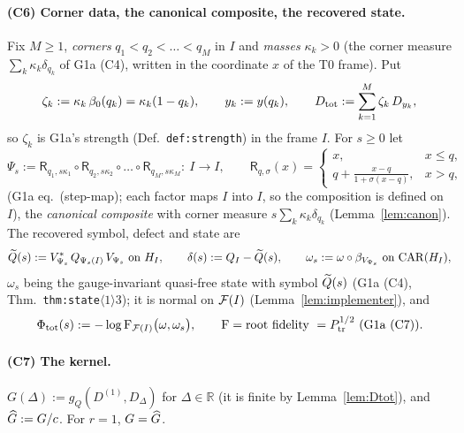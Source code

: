 \documentclass[11pt]{article}
\newcommand{\Dtot}{D_{\rm tot}}\newcommand{\Rp}{\mathsf R}\newcommand{\Lp}{\mathsf L}\newcommand{\Sch}{\mathcal S}
\theoremstyle{definition}\newtheorem{hypothesis}[theorem]{Hypothesis}
\begin{document}
\paragraph{(C6) Corner data, the canonical composite, the recovered state.}
Fix $M\ge1$, \emph{corners} $q_1<q_2<\dots<q_M$ in $I$ and \emph{masses} $\kappa_k>0$ (the corner measure
$\sum_k\kappa_k\delta_{q_k}$ of G1a (C4), written in the coordinate $x$ of the T0 frame).  Put
\begin{equation}\label{eq:zeta}
 \zeta_k:=\kappa_k\,\beta_0(q_k)=\kappa_k(1-q_k),\qquad y_k:=y(q_k),\qquad
 \Dtot:=\sum_{k=1}^M\zeta_k\,D_{y_k},
\end{equation}
so $\zeta_k$ is G1a's strength (Def.~\texttt{def:strength}) in the frame $I$.  For $s\ge0$ let
\begin{equation}\label{eq:Psi}
 \Psi_s:=\Rp_{q_1,s\kappa_1}\circ\Rp_{q_2,s\kappa_2}\circ\dots\circ\Rp_{q_M,s\kappa_M}:\ I\to I,
 \qquad \Rp_{q,\sigma}(x)=\begin{cases}x,&x\le q,\\ q+\frac{x-q}{1+\sigma(x-q)},&x>q,\end{cases}
\end{equation}
(G1a eq.~(step-map); each factor maps $I$ into $I$, so the composition is defined on $I$), the
\emph{canonical composite} with corner measure $s\sum_k\kappa_k\delta_{q_k}$
(Lemma~\ref{lem:canon}).  The recovered symbol, defect and state are
\begin{equation}\label{eq:Qts}
 \widetilde Q(s):=V_{\Psi_s}^*\,Q_{\Psi_s(I)}\,V_{\Psi_s}\ \text{on }H_I,\qquad \delta(s):=Q_I-\widetilde Q(s),\qquad
 \omega_s:=\omega\circ\beta_{V_{\Psi_s}}\ \text{on }\mathrm{CAR}(H_I),
\end{equation}
$\omega_s$ being the gauge-invariant quasi-free state with symbol $\widetilde Q(s)$ (G1a (C4),
Thm.~\texttt{thm:state}$\langle1\rangle3$); it is normal on $\mathcal F(I)$ (Lemma~\ref{lem:implementer}), and
\begin{equation}\label{eq:Phitot}
 \Phi_{\rm tot}(s):=-\log\operatorname{F}_{\mathcal F(I)}\bigl(\omega,\omega_s\bigr),\qquad
 \operatorname{F}=\text{root fidelity }=P_{\rm tr}^{1/2}\ \text{(G1a (C7))}.
\end{equation}

\paragraph{(C7) The kernel.}
$G(\Delta):=g_Q(D^{(1)},D_\Delta)$ for $\Delta\in\mathbb R$ (it is finite by Lemma~\ref{lem:Dtot}), and
$\widehat G:=G/c$.  For $r=1$, $G=\widehat G$.
\end{document}
